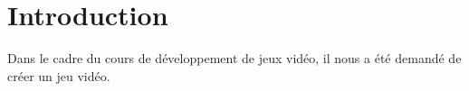 \section{Introduction}
Dans le cadre du cours de développement de jeux vidéo, il nous a été demandé de créer un jeu vidéo.
